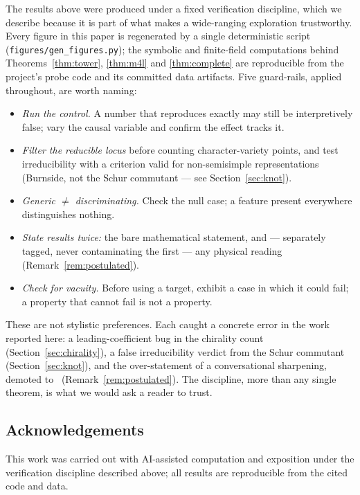 The results above were produced under a fixed verification discipline, which we describe
because it is part of what makes a wide-ranging exploration trustworthy. Every figure in
this paper is regenerated by a single deterministic script
(\texttt{figures/gen\_figures.py}); the symbolic and finite-field computations behind
Theorems~\ref{thm:tower}, \ref{thm:m4l} and \ref{thm:complete} are reproducible from the
project's probe code and its committed data artifacts. Five guard-rails, applied
throughout, are worth naming:
\begin{itemize}[leftmargin=1.4em]
\item \emph{Run the control.} A number that reproduces exactly may still be
  interpretively false; vary the causal variable and confirm the effect tracks it.
\item \emph{Filter the reducible locus} before counting character-variety points, and
  test irreducibility with a criterion valid for non-semisimple representations (Burnside,
  not the Schur commutant --- see Section~\ref{sec:knot}).
\item \emph{Generic $\ne$ discriminating.} Check the null case; a feature present
  everywhere distinguishes nothing.
\item \emph{State results twice:} the bare mathematical statement, and --- separately
  tagged, never contaminating the first --- any physical reading
  (Remark~\ref{rem:postulated}).
\item \emph{Check for vacuity.} Before using a target, exhibit a case in which it could
  fail; a property that cannot fail is not a property.
\end{itemize}
These are not stylistic preferences. Each caught a concrete error in the work reported
here: a leading-coefficient bug in the chirality count (Section~\ref{sec:chirality}), a
false irreducibility verdict from the Schur commutant (Section~\ref{sec:knot}), and the
over-statement of a conversational sharpening, demoted to \sPost\
(Remark~\ref{rem:postulated}). The discipline, more than any single theorem, is what we
would ask a reader to trust.

\subsection*{Acknowledgements}
This work was carried out with AI-assisted computation and exposition under the
verification discipline described above; all results are reproducible from the cited code
and data.
